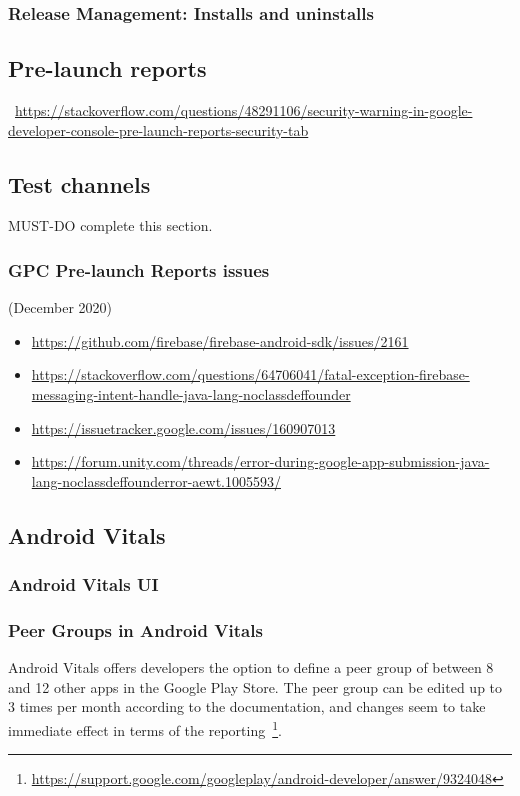 \subsubsection{Release Management: Installs and uninstalls}




\subsection{Pre-launch reports}

~\url{https://stackoverflow.com/questions/48291106/security-warning-in-google-developer-console-pre-launch-reports-security-tab}

\subsection{Test channels}\label{subsection-test-channels}
MUST-DO complete this section.

\subsubsection{GPC Pre-launch Reports issues}
(December 2020)

\begin{itemize}
    \item \url{https://github.com/firebase/firebase-android-sdk/issues/2161}
    \item \url{https://stackoverflow.com/questions/64706041/fatal-exception-firebase-messaging-intent-handle-java-lang-noclassdeffounder}
    \item \url{https://issuetracker.google.com/issues/160907013}
    \item \url{https://forum.unity.com/threads/error-during-google-app-submission-java-lang-noclassdeffounderror-aewt.1005593/}    
\end{itemize}







\subsection{Android Vitals}
\subsubsection{Android Vitals UI}

\subsubsection{Peer Groups in Android Vitals}\label{android-vitals-peer-groups}
Android Vitals offers developers the option to define a peer group of between 8 and 12 other apps in the Google Play Store. The peer group can be edited up to 3 times per month according to the documentation, and changes seem to take immediate effect in terms of the reporting~\footnote{\url{https://support.google.com/googleplay/android-developer/answer/9324048}}.

